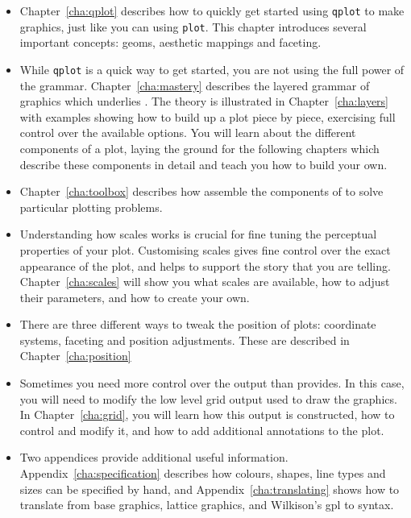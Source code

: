 \begin{itemize}
	\item Chapter~\ref{cha:qplot} describes how to quickly get started using {\tt qplot} to make graphics, just like you can using {\tt plot}.  This chapter introduces several important \ggplot concepts: geoms, aesthetic mappings and faceting.
	
	\item While {\tt qplot} is a quick way to get started, you are not using the full power of the grammar.  Chapter~\ref{cha:mastery} describes the layered grammar of graphics which underlies \ggplot.  The theory is illustrated in Chapter~\ref{cha:layers} with examples showing how to build up a plot piece by piece, exercising full control over the available options.  You will learn about the different components of a plot, laying the ground for the following chapters which describe these components in detail and teach you how to build your own. 

	\item Chapter~\ref{cha:toolbox} describes how assemble the components of \ggplot to solve particular plotting problems.

	\item Understanding how scales works is crucial for fine tuning the perceptual properties of your plot.  Customising scales gives fine control over the exact appearance of the plot, and helps to support the story that you are telling.  Chapter~\ref{cha:scales} will show you what scales are available, how to adjust their parameters, and how to create your own.

	\item There are three different ways to tweak the position of plots: coordinate systems, faceting and position adjustments.  These are described in Chapter~\ref{cha:position}
	
	
	\item Sometimes you need more control over the output than \ggplot provides.  In this case, you will need to modify the low level grid output used to draw the graphics.  In Chapter~\ref{cha:grid}, you will learn how this output is constructed, how to control and modify it, and how to add additional annotations to the plot.

  \item Two appendices provide additional useful information.  Appendix~\ref{cha:specification} describes how colours, shapes, line types and sizes can be specified by hand, and Appendix~\ref{cha:translating} shows how to translate from base graphics, lattice graphics, and Wilkison's {\sc gpl} to \ggplot syntax.

\end{itemize}

